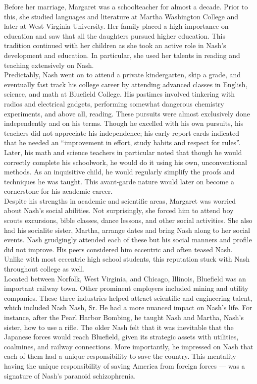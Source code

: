 \documentclass[12pt]{article}
\begin{document}
Before her marriage, Margaret was a schoolteacher for almost a decade. Prior to this, she studied languages and literature at Martha Washington College and later at West Virginia University. Her family placed a high importance on education and saw that all the daughters pursued higher education. This tradition continued with her children as she took an active role in Nash's development and education. In particular, she used her talents in reading and teaching extensively on Nash.\\

Predictably, Nash went on to attend a private kindergarten, skip a grade, and eventually fast track his college career by attending advanced classes in English, science, and math at  Bluefield College. His pastimes involved tinkering with radios and electrical gadgets, performing somewhat dangerous chemistry experiments, and above all, reading. These pursuits were almost exclusively done independently and on his terms. Though he excelled with his own pursuits, his teachers did not appreciate his independence; his early report cards indicated that he needed an ``improvement in effort, study habits and respect for rules''\cite{24}. Later, his math and science teachers in particular noted that though he would correctly complete his schoolwork, he would do it using his own, unconventional methods. As an inquisitive child, he would regularly simplify the proofs and techniques he was taught. This avant-garde nature would later on become a cornerstone for his academic career.\\

Despite his strengths in academic and scientific areas, Margaret was worried about Nash's social abilities. Not surprisingly, she forced him to attend boy scouts excursions, bible classes, dance lessons, and other social activities. She also had his socialite sister, Martha, arrange dates and bring Nash along to her social events. Nash grudgingly attended each of these but his social manners and profile did not improve. His peers considered him eccentric and often teased Nash. Unlike with most eccentric high school students, this reputation stuck with Nash throughout college as well.\\

Located between Norfolk, West Virginia, and Chicago, Illinois, Bluefield was an important railway town. Other prominent employers included mining and utility companies. These three industries helped attract scientific and engineering talent, which included Nash Nash, Sr. He had a more nuanced impact on Nash's life. For instance, after the Pearl Harbor Bombing, he taught Nash and Martha, Nash's sister, how to use a rifle. The older Nash felt that it was inevitable that the Japanese forces would reach Bluefield, given its strategic assets with utilities, coalmines, and railway connections. More importantly, he impressed on Nash that each of them had a unique responsibility to save the country. This mentality --- having the unique responsibility of saving America from foreign forces --- was a signature of Nash's paranoid schizophrenia.
\end{document}
